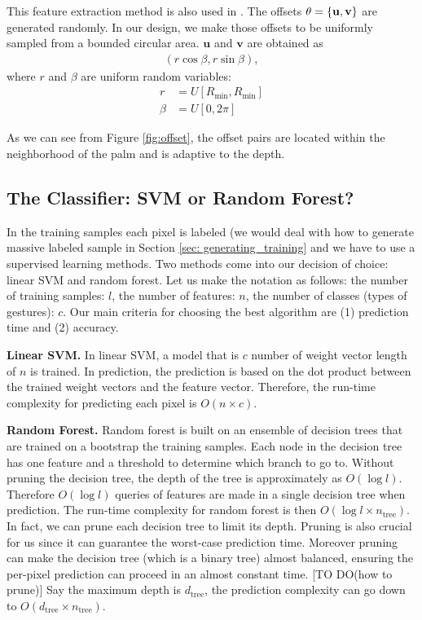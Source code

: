This feature extraction method is also used in \cite{shotton2011}. The offsets $\theta=\{\bf{u}, \bf{v} \}$ are generated randomly. In our design, we make those offsets to be uniformly sampled from a bounded circular area.  
$\textbf{u}$ and $\textbf{v}$ are obtained as
\begin{align}
\label{enq: offest}
 (r \cos \beta, r \sin \beta),
\end{align}
where $r$ and $\beta$ are uniform random variables:
\begin{align}
 r &= U[R_{\text{min}}, R_{\text{min}}] \\
 \beta &= U[0, 2\pi]
\end{align}

 As we can see from Figure \ref{fig:offset}, the offset pairs are located within the neighborhood of the palm and is adaptive to the depth.  

\subsection{The Classifier: SVM or Random Forest?}

In the training samples each pixel is labeled (we would deal with how to generate massive labeled sample in Section \ref{sec: generating_training}   and we have to use a supervised learning methods. Two methods come into our decision of choice: linear SVM and random forest. Let us make the notation as follows: the number of training samples: $l$, the number of features: $n$, the number of classes (types of gestures): $c$. Our main criteria for choosing the best algorithm are (1) prediction time and (2) accuracy. 

\textbf{Linear SVM.} In linear SVM, a model that is $c$ number of weight vector length of $n$ is trained. In prediction, the prediction is based on the dot product between the trained weight vectors and the feature vector. Therefore,  the run-time complexity for predicting each pixel is $O(n\times c)$.



\textbf{Random Forest.} Random forest is built on an ensemble of decision trees that are trained on a bootstrap the training samples. Each node in the decision tree has one feature and a threshold to determine which branch to go to. Without pruning the decision tree, the depth of the tree is approximately as $O(\log l)$. Therefore $O(\log l)$ queries of features are made in a single decision tree when prediction. The run-time complexity for random forest is then $O(\log l \times n_{\text{tree}})$. In fact, we can prune each decision tree to limit its depth. Pruning is also crucial for us since it can guarantee the worst-case prediction time. Moreover pruning can make the decision tree (which is a binary tree) almost balanced, ensuring the per-pixel prediction can proceed in an almost constant time.   [TO DO(how to prune)] Say the maximum depth is $d_{\text{tree}}$, the prediction complexity can go down to $O(d_{\text{tree}}\times n_{\text{tree}})$. 

